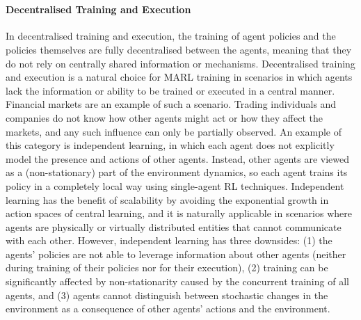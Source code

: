 \documentclass{article}
\begin{document}
\

\paragraph{Decentralised Training and Execution}  In decentralised training and execution, the training of agent policies and the policies themselves are fully decentralised between the agents, meaning that they do not rely on centrally shared information or mechanisms. Decentralised training and execution is a natural choice for MARL training in scenarios in which agents lack the information or ability to be trained or executed in a central manner. Financial markets are an example of such a scenario. Trading individuals and companies do not know how other agents might act or how they affect the markets, and any such influence can only be partially observed. An example of this category is independent learning, in which each agent does not explicitly model the presence and actions of other agents. Instead, other agents are viewed as a (non-stationary) part of the environment dynamics, so each agent trains its policy in a completely local way using single-agent RL techniques. Independent learning has the benefit of scalability by avoiding the exponential growth in action spaces of central learning, and it is naturally applicable in scenarios where agents are physically or virtually distributed entities that cannot communicate with each other. However, independent learning has three downsides: (1) the agents’ policies are not able to leverage information about other agents (neither during training of their policies nor for their execution), (2) training can be significantly affected by non-stationarity caused by the concurrent training of all agents, and (3) agents cannot distinguish between stochastic changes in the environment as a consequence of other agents’ actions and the environment.

\
\end{document}
